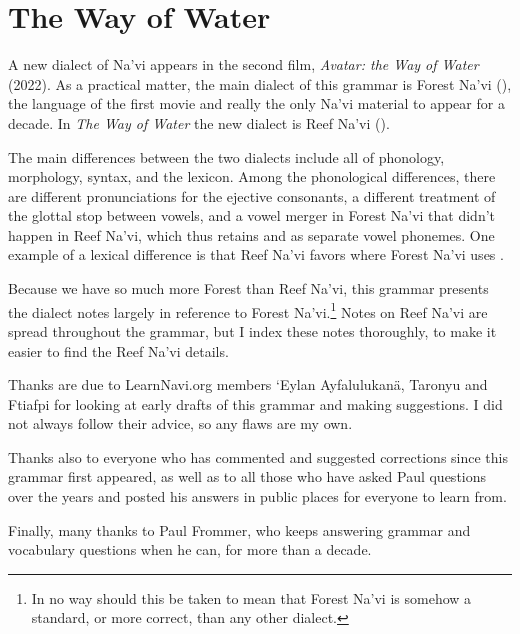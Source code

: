 \section{The Way of Water}
A new dialect of Na'vi appears in the second film, \textit{Avatar: the
Way of Water} (2022).  As a practical matter, the main dialect of this
grammar is Forest Na'vi (), the language of the
first movie and really the only Na'vi material to appear for a decade.
In \textit{The Way of Water} the new dialect is Reef Na'vi ().

The main differences between the two dialects include all of
phonology, morphology, syntax, and the lexicon.  Among the
phono\-logical differences, there are different pronunciations for the
ejective consonants, a different treatment of the glottal stop between
vowels, and a vowel merger in Forest Na'vi that didn't happen in Reef
Na'vi, which thus retains  and  as separate vowel phonemes.
One example of a lexical difference is that Reef Na'vi
favors   where Forest Na'vi uses .

Because we have so much more Forest than Reef Na'vi, this grammar
presents the dialect notes largely in reference to Forest
Na'vi.\footnote{In no way should this be taken to mean that Forest
Na'vi is somehow a standard, or more correct, than any other dialect.}
Notes on Reef Na'vi are spread throughout the grammar, but I index
these notes thoroughly, to make it easier to find the Reef Na'vi
details.



\vfill
Thanks are due to LearnNavi.org members `Eylan Ayfalulukanä, Taronyu
and Ftiafpi for looking at early drafts of this grammar and making
suggestions.  I did not always follow their advice, so any flaws are
my own.

Thanks also to everyone who has commented and suggested corrections
since this grammar first appeared, as well as to all those who have
asked Paul questions over the years and posted his answers in public
places for everyone to learn from.

Finally, many thanks to Paul Frommer, who keeps answering grammar
and vocabulary ques\-tions when he can, for more than a decade.



\bigskip
